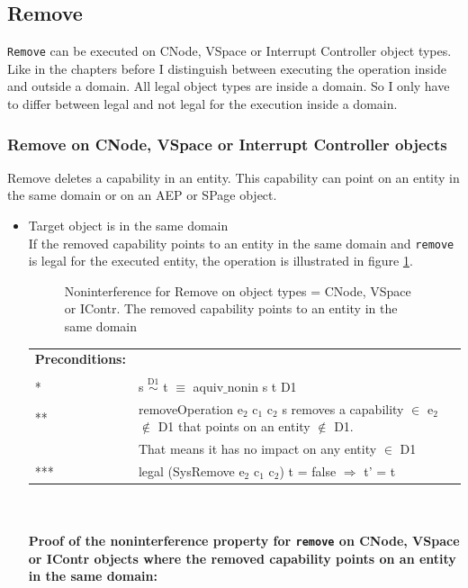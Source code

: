\documentclass[11pt,a4paper,twoside]{article}
\begin{document}
{\subsection{Remove}\label{sec:Remove}
\texttt{Remove} can be executed on CNode, VSpace or Interrupt Controller object types. \\
Like in the chapters before I distinguish between executing the operation inside and outside a domain. All legal object types are inside a domain. So I only have to differ between legal and not legal for the execution inside a domain. 
\subsubsection{Remove on CNode, VSpace or Interrupt Controller objects} 
Remove deletes a capability in an entity. This capability can point on an entity in the same domain or on an AEP or SPage object. 
\begin{itemize}
\item Target object is in the same domain \\
If the removed capability points to an entity in the same domain and  \texttt{remove} is legal for the executed entity, the operation is illustrated in figure \ref{fig:RemoveCNode}.
\begin{flushleft}
\begin{figure}[H]
\caption{Noninterference for Remove on object types = CNode, VSpace or IContr. The removed capability points to an entity in the same domain}
\label{fig:RemoveCNode}
\end{figure}
\end{flushleft}
\begin{tabular}{ll}
\textbf{Preconditions:} \\ \\
* & s $\overset{\text{D1}}{\sim}$ t $\equiv$ aquiv$\_$nonin s t D1	\\ 
** & removeOperation e$_2$ c$_1$ c$_2$ s removes a capability $\in$ e$_2$ $\notin$ D1 that points on an entity $\notin$ D1. \\
& That means it has no impact on any entity $\in$ D1 \\ 
*** & legal (SysRemove e$_2$ c$_1$ c$_2$) t = false $\Rightarrow$ t' = t
\end{tabular} \\ \\ 
\textbf{Proof of the noninterference property for \texttt{remove} on CNode, VSpace or IContr objects where the removed capability points on an entity in the same domain:}\\ \\

\end{itemize}}
\end{document}
